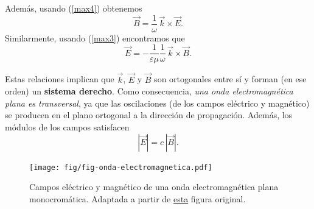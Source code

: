 Además, usando (\ref{max4}) obtenemos
\begin{equation}\label{BkE}
 \vec{B}=\frac{1}{\omega}\,\vec{k}\times\vec{E}.
\end{equation}
Similarmente, usando (\ref{max3}) encontramos que
\begin{equation}
 \vec{E}=-\frac{1}{\varepsilon\mu}\frac{1}{\omega}\,\vec{k}\times\vec{B}.
\end{equation}

Estas relaciones implican que $\vec{k}$, $\vec{E}$ y $\vec{B}$ son ortogonales
entre sí y forman (en ese orden) un \textbf{sistema derecho}. Como consecuencia, \textit{una onda electromagnética plana es transversal}, ya que las oscilaciones (de los campos eléctrico y magnético) se producen en el plano ortogonal a la dirección de propagación. Además, los módulos de los campos satisfacen
\begin{equation}
 | \vec{E}|=c\,| \vec{B}| .
\end{equation}
\begin{figure}[!h]
\centerline{\texttt{[image: fig/fig-onda-electromagnetica.pdf]}}
\caption{Campos eléctrico y magnético de una onda electromagnética plana monocromática. Adaptada a partir de \href{http://commons.wikimedia.org/wiki/File:Onde_electromagnetique.svg}{esta} figura original.}
\label{ondaem}
\end{figure}

